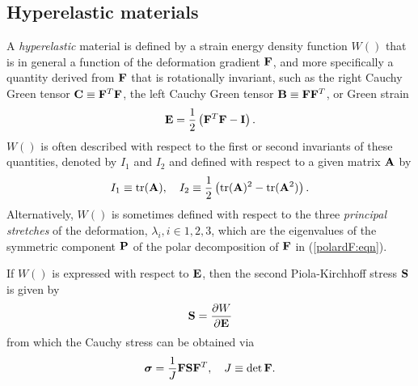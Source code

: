 \subsection{Hyperelastic materials}

A {\it hyperelastic} material is defined by a strain energy density
function $W()$ that is in general a function of the deformation gradient
$\F$, and more specifically a quantity derived from $\F$ that is
rotationally invariant, such as the right Cauchy Green 
tensor $\C \equiv \F^T \F$, the left Cauchy Green 
tensor $\B \equiv \F \F^T$, or Green strain
%
\begin{equation}
\E = \frac{1}{2}\left( \F^T \F - \I \right).
\end{equation}
%
$W()$ is often described with respect to the first or second invariants
of these quantities, denoted by $I_1$ and $I_2$ and defined with
respect to a given matrix $\A$ by
%
\begin{equation}
I_1 \equiv \tr (\A), \quad
I_2 \equiv \frac{1}{2}\left( \tr(\A)^2 - \tr(\A^2) \right).
\end{equation}
%
Alternatively, $W()$ is sometimes defined with respect to the three
{\it principal stretches} of the deformation, $\lambda_i, i \in {1, 2,
3}$, which are the eigenvalues of the symmetric component $\P$ of the
polar decomposition of $\F$ in (\ref{polardF:eqn}).

If $W()$ is expressed with respect to $\E$, then the second
Piola-Kirchhoff stress $\S$ is given by
%
\begin{equation}
\S = \frac{\partial W}{\partial \E}
\end{equation}
%
from which the Cauchy stress can be obtained via
%
\begin{equation}
\Bsig = \frac{1}{J} \F \S \F^T, \quad J \equiv \det \F.
\end{equation}
%

